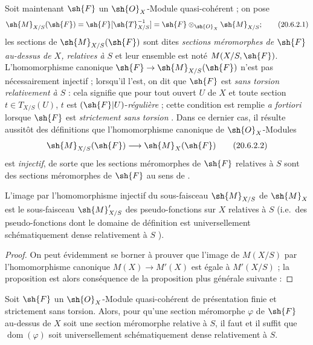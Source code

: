\begin{env}[20.6.2]
Soit maintenant $\sh{F}$ un $\sh{O}_X$-Module quasi-cohérent ; on pose
\[
\label{IV.20.6.2.1}
  \sh{M}_{X/S}(\sh{F})=\sh{F}[\sh{T}_{X/S}^{-1}]=\sh{F}\otimes_{\sh{O}_X}\sh{M}_{X/S};
  \tag{20.6.2.1}
\]
les sections de $\sh{M}_{X/S}(\sh{F})$ sont dites \emph{sections méromorphes de $\sh{F}$ au-dessus de $X$, relatives à $S$} et leur ensemble est noté $M(X/S,\sh{F})$.
L'homomorphisme canonique $\sh{F}\to\sh{M}_{X/S}(\sh{F})$ n'est pas nécessairement injectif ; lorsqu'il l'est, on dit que $\sh{F}$ est \emph{sans torsion relativement à $S$} : cela signifie que pour tout ouvert $U$ de $X$ et toute section $t\in T_{X/S}(U)$, $t$ est $(\sh{F}|U)$-\emph{régulière} ; cette condition est remplie \emph{a fortiori} lorsque $\sh{F}$ est \emph{strictement sans torsion} .
Dans ce dernier cas, il résulte aussitôt des définitions  que l'homomorphisme canonique de $\sh{O}_X$-Modules
\[
\label{IV.20.6.2.2}
  \sh{M}_{X/S}(\sh{F})\to\sh{M}_X(\sh{F})
  \tag{20.6.2.2}
\]
est \emph{injectif}, de sorte que les sections méromorphes de $\sh{F}$ relatives à $S$ sont des sections méromorphes de $\sh{F}$ au sens de .
\end{env}

\begin{proposition}[20.6.3]
\label{IV.20.6.3}
L'image par l'homomorphisme injectif  du sous-faisceau $\sh{M}_{X/S}$ de $\sh{M}_X$ est le sous-faisceau $\sh{M}'_{X/S}$ des pseudo-fonctions sur $X$ relatives à $S$ \textup{(i.e.}\ des pseudo-fonctions dont le domaine de définition est universellement schématiquement dense relativement à $S$ \textup{)}.
\end{proposition}

\begin{proof}
On peut évidemment se borner à prouver que l'image de $M(X/S)$ par l'homomorphisme canonique $M(X)\to M'(X)$ est égale à $M'(X/S)$ ; la proposition est alors conséquence de la proposition plus générale suivante :
\end{proof}

\begin{proposition}[20.6.4]
\label{IV.20.6.4}
Soit $\sh{F}$ un $\sh{O}_X$-Module quasi-cohérent de présentation finie et strictement sans torsion.
Alors, pour qu'une section méromorphe $\varphi$ de $\sh{F}$ au-dessus de $X$ soit une section méromorphe relative à $S$, il faut et il suffit que $\operatorname{dom}(\varphi)$ soit universellement schématiquement dense relativement à $S$.
\end{proposition}

